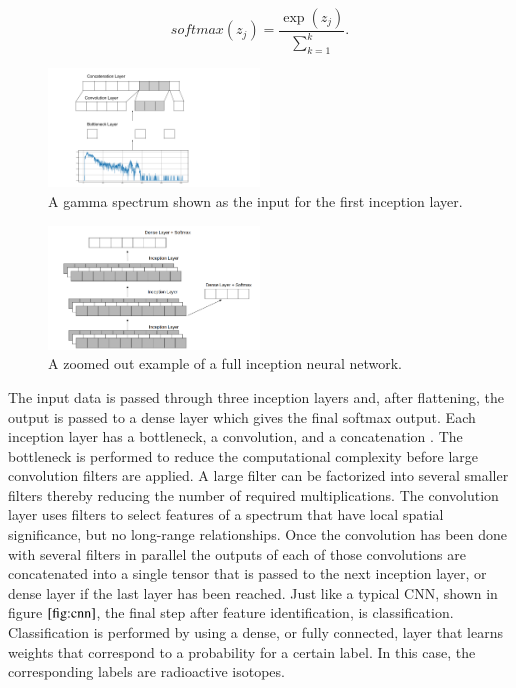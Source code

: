 \documentclass{anstrans}
\begin{document}
\begin{equation}
softmax(z_j) = \frac{\exp(z_j)}{\sum_{k=1}^{k}}.
\end{equation}

\begin{figure}[h]
    \centering
    \includegraphics[width=0.5\textwidth]{inn-layer_figure.png}
    \caption{A gamma spectrum shown as the input for the first inception layer.}
    \label{fig:inn-layer}
\end{figure}
\begin{figure}[h]
    \centering
    \includegraphics[width=0.5\textwidth]{inn-full-figure.png}
    \caption{A zoomed out example of a full inception neural network.}
    \label{fig:inn-full}
\end{figure}

The input data is passed through three inception layers and, after flattening, the output is passed to a dense layer which gives the final softmax output. 
Each inception layer has a bottleneck, a convolution, and a concatenation \cite{szegedyGoingDeeperConvolutions2014} \cite{szegedyRethinkingInceptionArchitecture2015}.
The bottleneck is performed to reduce the computational complexity before large convolution filters are applied. 
A large filter can be factorized into several smaller filters thereby reducing the number of required multiplications. 
The convolution layer uses filters to select features of a spectrum that have local spatial significance, but no long-range relationships. 
Once the convolution has been done with several filters in parallel the outputs of each of those convolutions are concatenated into a single tensor that is passed to the next inception layer, or dense layer if the last layer has been reached. 
Just like a typical CNN, shown in figure $\ref{fig:cnn}$, the final step after feature identification, is classification. 
Classification is performed by using a dense, or fully connected, layer that learns weights that correspond to a probability for a certain label. 
In this case, the corresponding labels are radioactive isotopes.
\end{document}
